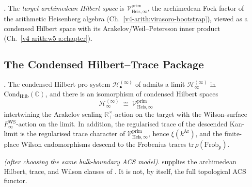 \begin{definition}
\label{v4-arith:w10-a:def:target-Hilbert}
\ClaimStatusDefinitional. The \emph{target archimedean Hilbert
space} is
\(\mathcal V^{\mathrm{prim}}_{\mathrm{Heis},\infty}\), the archimedean
Fock factor of the arithmetic Heisenberg algebra
(Ch.~\ref{v4-arith:virasoro-bootstrap}), viewed as a condensed
Hilbert space with its Arakelov/Weil--Petersson inner product
(Ch.~\ref{v4-arith:w5-a:chapter}).
\end{definition}

\subsection{The Condensed Hilbert--Trace Package}
\label{v4-arith:w10-a:named-obstruction}

\begin{conjecture}
\label{v4-arith:w10-a:conj:condensed-descent}
\ClaimStatusConjectured. The condensed-Hilbert pro-system
\(\mathcal H^{(\infty)}_{\bullet}\) of
 admits a limit
\(\mathcal H^{(\infty)}_{\infty}\) in \(\mathrm{Cond}_{\mathrm{Hilb}}(\mathbb C)\),
and there is an isomorphism of condensed Hilbert spaces
\begin{equation}
\label{v4-arith:w10-a:eq:condensed-descent}
\mathcal H^{(\infty)}_{\infty}
\;\cong\;
\mathcal V^{\mathrm{prim}}_{\mathrm{Heis},\infty}
\end{equation}
intertwining the Arakelov scaling \(\mathbb{R}^{\times}_{+}\)-action
on the target with the Wilson-surface
\(F_{\infty}^{\mathrm{WS}}\)-action on the limit.
In addition, the regularised trace of the descended Kan-limit is the
regularised trace character of
\(\mathcal V^{\mathrm{prim}}_{\mathrm{Heis},\infty}\), hence
\(\xi(k^{\mathrm{Ar}})\), and the finite-place Wilson endomorphisms
descend to the Frobenius traces
\(\mathrm{tr}\,\rho(\mathrm{Frob}_{p})\).
\end{conjecture}

\begin{theorem}
\label{v4-arith:w10-a:thm:descent-equivalent}
\ClaimStatusProvedHereConditional \emph{(after choosing the same
bulk-boundary ACS model)}. 
supplies the archimedean Hilbert, trace, and Wilson clauses of
. It is not, by itself, the full
topological ACS functor.
\end{theorem}

